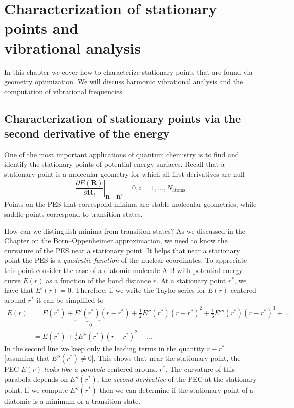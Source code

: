 \documentclass[../Main/chem371-notes.tex]{subfiles}
\begin{document}
\chapter{Characterization of stationary points and\\ vibrational analysis}

In this chapter we cover how to characterize stationary points that are found via geometry optimization.
We will discuss harmonic vibrational analysis and the computation of vibrational frequencies.

\section{Characterization of stationary points via the second derivative of the energy}

One of the most important applications of quantum chemistry is to find and identify the stationary points of  potential energy surfaces.
Recall that a stationary point is a molecular geometry for which all first derivatives are null
\begin{equation}
\left.\frac{\partial E(\mathbf{R})}{\partial \mathbf{R}_i}\right|_{\mathbf{R}=\mathbf{R}^*} = 0, i=1,\ldots,N_\mathrm{atoms}
\end{equation}
Points on the PES that correspond minima are stable molecular geometries, while saddle points correspond to transition states.

How can we distinguish minima from transition states? As we discussed in the Chapter on the Born--Oppenheimer approximation, we need to know the curvature of the PES near a stationary point.
It helps that near a stationary point the PES is a \emph{quadratic function} of the nuclear coordinates.
To appreciate this point consider the case of a diatomic molecule A-B with potential energy curve $E(r)$ as a function of the bond distance $r$.
At a stationary point $r^*$, we have that $E'(r) = 0$.
Therefore, if we write the Taylor series for $E(r)$ centered around $r^*$ it can be simplified to 
\begin{equation}
\begin{split}
E(r) & = E(r^*) + \underbrace{E'(r^*)}_{=0} (r - r^*) + \frac{1}{2} E''(r^*) (r - r^*)^2 + \frac{1}{6} E'''(r^*) (r - r^*)^3 + \ldots \\
& = E(r^*) + \frac{1}{2} E''(r^*) (r - r^*)^2 + \ldots
\end{split}
\end{equation}
In the second line we keep only the leading terms in the quantity $r - r^*$ [assuming that $E''(r^*) \neq 0$].
This shows that near the stationary point, the PEC $E(r)$ \emph{looks like a parabola} centered around $r^*$.
The curvature of this parabola depends on $E''(r^*)$, the \emph{second derivative} of the PEC at the stationary point.
If we compute $E''(r^*)$ then we can determine if the stationary point of a diatomic is a minimum or a transition state.
\end{document}
